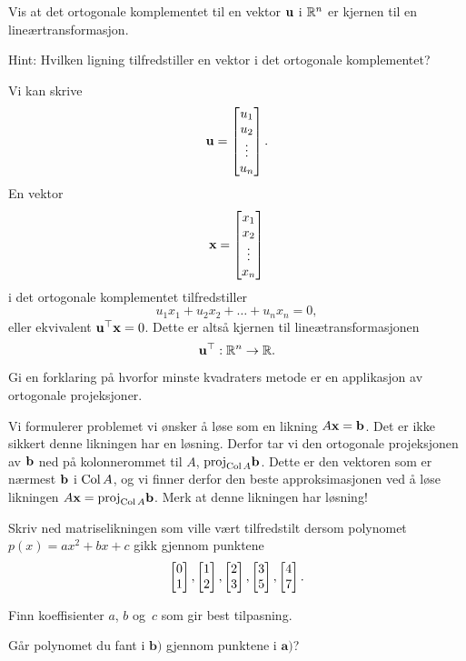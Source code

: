 

\begin{oppgave}
Vis at det ortogonale komplementet til en vektor $\mathbf{u}$ i $\mathbb{R}^n$
er kjernen til en lineærtransformasjon.

\noindent
Hint: Hvilken ligning tilfredstiller en vektor i det ortogonale komplementet?
\end{oppgave}

\begin{losning}
Vi kan skrive
\[
\mathbf{u}=\begin{bmatrix}
u_1\\
u_2\\
\vdots\\
u_n\\
\end{bmatrix}.
\]
En vektor
\[
\mathbf{x}=\begin{bmatrix}
x_1\\
x_2\\
\vdots\\
x_n\\
\end{bmatrix}
\]
i det ortogonale komplementet tilfredstiller
\[
u_1x_1+u_2x_2+\dots +u_nx_n=0,
\]
eller ekvivalent $\mathbf{u}^\top \mathbf{x}=0$.
Dette er altså kjernen til lineætransformasjonen
\[
\mathbf{u}^\top:\mathbb{R}^n\rightarrow \mathbb{R}.
\]
\end{losning}


\begin{oppgave}
Gi en forklaring på hvorfor minste kvadraters metode er en applikasjon av ortogonale projeksjoner.
\end{oppgave}

\begin{losning}
Vi formulerer problemet vi ønsker å løse som en likning $A\mathbf{x}=\mathbf{b}$. Det er ikke sikkert denne likningen har en løsning. Derfor tar vi den ortogonale projeksjonen av $\mathbf{b}$ ned på kolonnerommet til $A$, $\text{proj}_{\operatorname{Col} A}\mathbf{b}$. Dette er den vektoren som er nærmest $\mathbf{b}$ i $\operatorname{Col} A$, og vi finner derfor den beste approksimasjonen ved å løse likningen $A\mathbf{x}=\text{proj}_{\operatorname{Col} A}\mathbf{b}$. Merk at denne likningen har løsning!
\end{losning}

\begin{oppgave}
\begin{punkt}
Skriv ned matriselikningen som ville vært tilfredstilt dersom polynomet $p(x)=ax^2+bx+c$ gikk gjennom punktene
$$\begin{bmatrix} 0 \\ 1 \end{bmatrix}, \begin{bmatrix} 1 \\ 2 \end{bmatrix}, \begin{bmatrix} 2 \\ 3 \end{bmatrix},\begin{bmatrix} 3 \\ 5 \end{bmatrix},\begin{bmatrix} 4 \\ 7 \end{bmatrix}.$$
\end{punkt}
\begin{punkt}
Finn koeffisienter $a$, $b$ og~$c$ som gir best tilpasning.
\end{punkt}

\begin{punkt}
Går polynomet du fant i $\textbf{b)}$ gjennom punktene i $\textbf{a)}$?
\end{punkt}

\end{oppgave}

